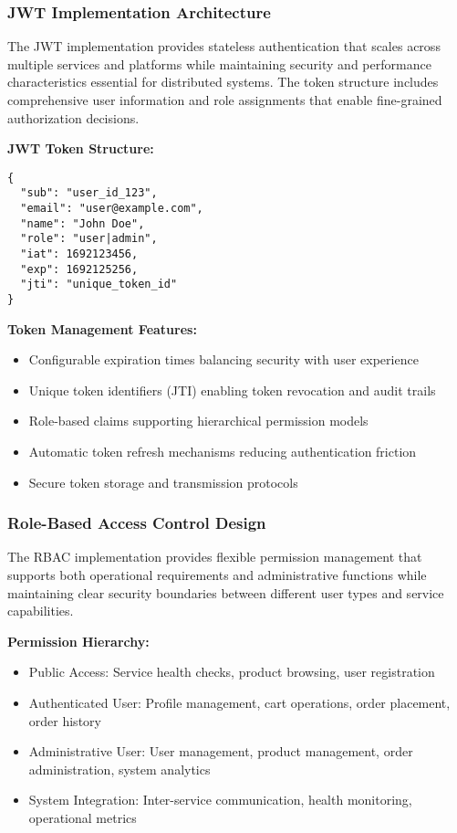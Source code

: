 \subsubsection{JWT Implementation Architecture}

The JWT implementation provides stateless authentication that scales across multiple services and platforms while maintaining security and performance characteristics essential for distributed systems. The token structure includes comprehensive user information and role assignments that enable fine-grained authorization decisions.

\textbf{JWT Token Structure:}
\begin{verbatim}
{
  "sub": "user_id_123",
  "email": "user@example.com", 
  "name": "John Doe",
  "role": "user|admin",
  "iat": 1692123456,
  "exp": 1692125256,
  "jti": "unique_token_id"
}
\end{verbatim}

\textbf{Token Management Features:}
\begin{itemize}
\item Configurable expiration times balancing security with user experience
\item Unique token identifiers (JTI) enabling token revocation and audit trails
\item Role-based claims supporting hierarchical permission models
\item Automatic token refresh mechanisms reducing authentication friction
\item Secure token storage and transmission protocols
\end{itemize}

\subsubsection{Role-Based Access Control Design}

The RBAC implementation provides flexible permission management that supports both operational requirements and administrative functions while maintaining clear security boundaries between different user types and service capabilities.

\textbf{Permission Hierarchy:}
\begin{itemize}
\item Public Access: Service health checks, product browsing, user registration
\item Authenticated User: Profile management, cart operations, order placement, order history
\item Administrative User: User management, product management, order administration, system analytics
\item System Integration: Inter-service communication, health monitoring, operational metrics
\end{itemize}

